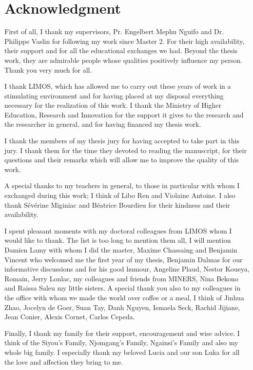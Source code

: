 \chapter*{Acknowledgment}
First of all, I thank my supervisors, Pr. Engelbert Mephu Nguifo and Dr.  Philippe Vaslin for following my work since Master 2. For their high availability, their support and for all the educational exchanges we had. Beyond the thesis work, they are admirable people whose qualities positively influence my person. Thank you very much for all.

I thank LIMOS, which has allowed me to carry out these years of work in a stimulating environment and for having placed at my disposal everything necessary for the realization of this work. I thank  the Ministry of Higher Education, Research and Innovation  for the support it gives to the research and the researcher in general, and for having financed my thesis work. 

I thank the members of my thesis jury for having accepted to take part in this jury. I thank them for the time they devoted to reading the manuscript, for their questions and their remarks which will allow me to improve the quality of this work.

A special thanks to my teachers in general, to those in particular with whom I exchanged during this work; I think of Libo Ren and Violaine Antoine. I also thank Sévérine Miginiac and Béatrice Bourdieu for their kindness and their availability.

I spent pleasant moments with my doctoral colleagues from LIMOS whom I would like to thank. The list is too long to mention them all, I will mention Damien Lamy with whom I did the master, Maxime Chassaing and Benjamin Vincent who welcomed me the first year of my thesis, Benjamin Dalmas for our informative discussions and for his good humour, Angeline Plaud, Nestor Koueya, Romain, Jerry Lonlac, my colleagues and friends from MINERS, Nina Bekono and Raissa Saleu my little sisters. 
A special thank you also to my colleagues in the office with whom we made the world over coffee or a meal, I think of Jinhua Zhao, Jocelyn de Goer, Suan Tay, Danh Nguyen, Ismaela Seck, Rachid Jijiane, Jean Conier, Alexis Cornet, Carlos Cepeda.

Finally, I thank my family for their support, encouragement and wise advice. I think of the Siyou’s Family, Njomgang’s Family, Ngainsi’s Family  and also my whole big family. I especially thank my beloved Lucia and our son Luka for all the love and affection they bring to me. 
